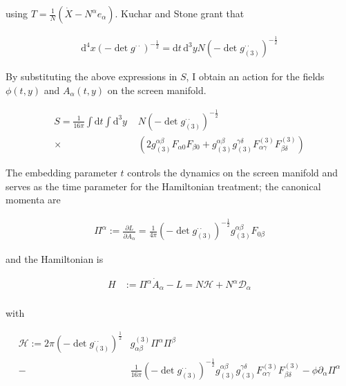 \documentclass[11pt]{article}
\begin{document}
using $ T = \frac{1}{N} \left( \dot{X} - N^\alpha e_{\alpha} \right)$. Kuchar  and Stone grant that 

\begin{align}
	\mathrm{d}^4 x \left( - \det{g^{\cdot \cdot}} \right)^{-\frac{1}{2}} = \mathrm{d}t \, \mathrm{d}^3 y N \left( - \det{g_{(3)}^{\cdot \cdot}} \right)^{-\frac{1}{2}}
\end{align}
 
By substituting the above expressions in $S$, I obtain an action for the fields $\phi (t, y) $ and $A_{\alpha} (t, y) $ on the screen manifold. 

\begin{align}
	S = \frac{1}{16 \pi} \int \mathrm{d}t \int \mathrm{d}^3 y \, \,
	&N \left( - \det{g_{(3)}^{\cdot \cdot}} \right)^{-\frac{1}{2}} \\ 
	\times 
	&\left(
	 2 g_{(3)}^{\alpha \beta} F_{\alpha 0 } F_{\beta 0 }  
	 + g_{(3)}^{\alpha \beta} g_{(3)}^{\gamma \delta } F^{(3)}_{\alpha \gamma}  F^{(3)}_{\beta \delta} 
	\right)
\end{align}

The embedding parameter $t$ controls the dynamics on the screen manifold and serves as the time parameter for the Hamiltonian treatment; the canonical momenta are 

\begin{align}
	\Pi^{\alpha} := \frac{\partial L}{\partial \dot{A}_{\alpha}} = \frac{1}{4\pi} \left( - \det{g_{(3)}^{\cdot \cdot}} \right)^{-\frac{1}{2}} 
	 g_{(3)}^{\alpha \beta} F_{0 \beta}
\end{align}

and the Hamiltonian is

\begin{align}
	H &:= \Pi^{\alpha} \dot{A}_{\alpha} - L = N \mathcal{H} + N^\alpha \mathcal{D}_{\alpha}\\
\end{align}

with 

\begin{equation}
\begin{split}
	\mathcal{H} :=  
	2 \pi \left( - \det{g_{(3)}^{\cdot \cdot}} \right)^{\frac{1}{2}} 
	& g_{\alpha \beta}^{(3)} \Pi^{\alpha} \Pi^{\beta} \\
	 - &\frac{1}{16 \pi} \left( - \det{g_{(3)}^{\cdot \cdot}} \right)^{- \frac{1}{2}} g_{(3)}^{\alpha \beta} g_{(3)}^{\gamma \delta } F^{(3)}_{\alpha \gamma}  F^{(3)}_{\beta \delta} 
	- \phi \partial_{\alpha} \Pi^{\alpha} 
\end{split}
\end{equation}
\end{document}
